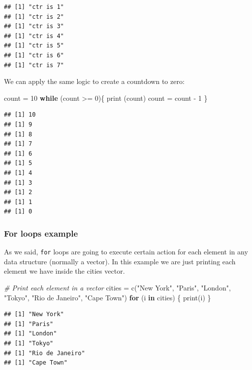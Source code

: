\documentclass[
]{book}
\newenvironment{Shaded}{\begin{snugshade}}{\end{snugshade}}
\newcommand{\CommentTok}[1]{\textcolor[rgb]{0.56,0.35,0.01}{\textit{#1}}}
\newcommand{\ControlFlowTok}[1]{\textcolor[rgb]{0.13,0.29,0.53}{\textbf{#1}}}
\newcommand{\DecValTok}[1]{\textcolor[rgb]{0.00,0.00,0.81}{#1}}
\newcommand{\FunctionTok}[1]{\textcolor[rgb]{0.00,0.00,0.00}{#1}}
\newcommand{\NormalTok}[1]{#1}
\newcommand{\OtherTok}[1]{\textcolor[rgb]{0.56,0.35,0.01}{#1}}
\newcommand{\SpecialCharTok}[1]{\textcolor[rgb]{0.00,0.00,0.00}{#1}}
\newcommand{\StringTok}[1]{\textcolor[rgb]{0.31,0.60,0.02}{#1}}
\begin{document}
\begin{verbatim}
## [1] "ctr is 1"
## [1] "ctr is 2"
## [1] "ctr is 3"
## [1] "ctr is 4"
## [1] "ctr is 5"
## [1] "ctr is 6"
## [1] "ctr is 7"
\end{verbatim}

We can apply the same logic to create a countdown to zero:

\begin{Shaded}
\begin{Highlighting}[]
\NormalTok{count }\OtherTok{=} \DecValTok{10}
\ControlFlowTok{while}\NormalTok{ (count }\SpecialCharTok{\textgreater{}=} \DecValTok{0}\NormalTok{)\{}
    \FunctionTok{print}\NormalTok{ (count)}
\NormalTok{    count }\OtherTok{=}\NormalTok{ count }\SpecialCharTok{{-}} \DecValTok{1}
\NormalTok{\}}
\end{Highlighting}
\end{Shaded}

\begin{verbatim}
## [1] 10
## [1] 9
## [1] 8
## [1] 7
## [1] 6
## [1] 5
## [1] 4
## [1] 3
## [1] 2
## [1] 1
## [1] 0
\end{verbatim}

\hypertarget{for-loops-example}{%
\subsubsection{For loops example}\label{for-loops-example}}

As we said, \texttt{for} loops are going to execute certain action for each element in any data structure (normally a vector). In this example we are just printing each element we have inside the cities vector.

\begin{Shaded}
\begin{Highlighting}[]
\CommentTok{\# Print each element in a vector}
\NormalTok{cities }\OtherTok{=} \FunctionTok{c}\NormalTok{(}\StringTok{"New York"}\NormalTok{, }\StringTok{"Paris"}\NormalTok{, }\StringTok{"London"}\NormalTok{, }\StringTok{"Tokyo"}\NormalTok{, }\StringTok{"Rio de Janeiro"}\NormalTok{, }\StringTok{"Cape Town"}\NormalTok{)}
\ControlFlowTok{for}\NormalTok{ (i }\ControlFlowTok{in}\NormalTok{ cities) \{}
  \FunctionTok{print}\NormalTok{(i)}
\NormalTok{\}}
\end{Highlighting}
\end{Shaded}

\begin{verbatim}
## [1] "New York"
## [1] "Paris"
## [1] "London"
## [1] "Tokyo"
## [1] "Rio de Janeiro"
## [1] "Cape Town"
\end{verbatim}
\end{document}
